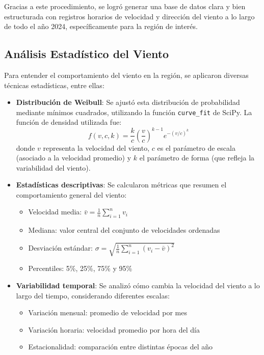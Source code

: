 \documentclass[a4paper,12pt]{article}
\begin{document}
			Gracias a este procedimiento, se logró generar una base de datos clara y bien estructurada con registros horarios de velocidad y dirección del viento a lo largo de todo el año 2024, específicamente para la región de interés.
			
		\subsection{Análisis Estadístico del Viento}
		\label{subsec:estadistico}
		
		Para entender el comportamiento del viento en la región, se aplicaron diversas técnicas estadísticas, entre ellas:
		
		\begin{itemize}
			\item \textbf{Distribución de Weibull}: Se ajustó esta distribución de probabilidad mediante mínimos cuadrados, utilizando la función \texttt{curve\_fit} de SciPy. La función de densidad utilizada fue:
			\begin{equation}
				f(v,c,k) = \frac{k}{c} \left( \frac{v}{c} \right)^{k-1} e^{-(v/c)^k}
				\label{eq:weibull}
			\end{equation}
			donde \(v\) representa la velocidad del viento, \(c\) es el parámetro de escala (asociado a la velocidad promedio) y \(k\) el parámetro de forma (que refleja la variabilidad del viento).
			
			\item \textbf{Estadísticas descriptivas}: Se calcularon métricas que resumen el comportamiento general del viento:
			\begin{itemize}
				\item Velocidad media: \(\bar{v} = \frac{1}{n}\sum_{i=1}^{n} v_i\)
				\item Mediana: valor central del conjunto de velocidades ordenadas
				\item Desviación estándar: \(\sigma = \sqrt{\frac{1}{n}\sum_{i=1}^{n} (v_i - \bar{v})^2}\)
				\item Percentiles: 5\%, 25\%, 75\% y 95\%
			\end{itemize}
			
			\item \textbf{Variabilidad temporal}: Se analizó cómo cambia la velocidad del viento a lo largo del tiempo, considerando diferentes escalas:
			\begin{itemize}
				\item Variación mensual: promedio de velocidad por mes
				\item Variación horaria: velocidad promedio por hora del día
				\item Estacionalidad: comparación entre distintas épocas del año
			\end{itemize}
		\end{itemize}
		
\end{document}

